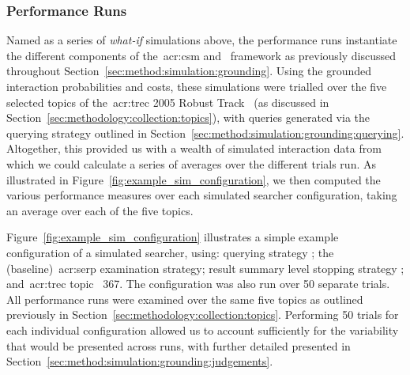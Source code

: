 \subsubsection{Performance Runs}\label{sec:method:simulation:runs:performance}
Named as a series of \emph{what-if} simulations above, the performance runs instantiate the different components of the~\gls{acr:csm} and \simiir~framework as previously discussed throughout Section~\ref{sec:method:simulation:grounding}. Using the grounded interaction probabilities and costs, these simulations were trialled over the five selected topics of the~\gls{acr:trec} 2005 Robust Track~\citep{voorhees2006trec_robust} (as discussed in Section~\ref{sec:methodology:collection:topics}), with queries generated via the querying strategy outlined in Section~\ref{sec:method:simulation:grounding:querying}. Altogether, this provided us with a wealth of simulated interaction data from which we could calculate a series of averages over the different trials run. As illustrated in Figure~\ref{fig:example_sim_configuration}, we then computed the various performance measures over each simulated searcher configuration, taking an average over each of the five topics.

Figure~\ref{fig:example_sim_configuration} illustrates a simple example configuration of a simulated searcher, using: querying strategy ; the  (baseline)~\gls{acr:serp} examination strategy; result summary level stopping strategy ; and~\gls{acr:trec} topic \textnumero~367. The configuration was also run over 50 separate trials. All performance runs were examined over the same five topics as outlined previously in Section~\ref{sec:methodology:collection:topics}. Performing 50 trials for each individual configuration allowed us to account sufficiently for the variability that would be presented across runs, with further detailed presented in Section~\ref{sec:method:simulation:grounding:judgements}.


